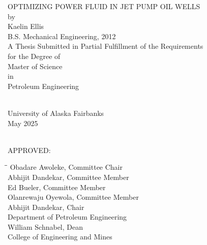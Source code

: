 \documentclass[12 pt]{report}
\begin{document}


\thispagestyle{empty}
    \begin{center}
      \uppercase{Optimizing Power Fluid in Jet Pump Oil Wells}\\
      \hfill \break by  \\
      Kaelin Ellis\\
      B.S. Mechanical Engineering, 2012\\
      \hfill \break
      A Thesis Submitted in Partial Fulfillment of the Requirements\\ 
       for the Degree of\\
      \hfill \break
      Master of Science\\
       in\\
      Petroleum Engineering\\    
      \  
         
      University of Alaska Fairbanks\\
      May 2025\\
      \
 
      APPROVED:
    \end{center}
\begin{tabbing}
\hspace{8cm}\=\hspace{1cm}\=\kill
  \> Obadare Awoleke, Committee Chair \\
  \> Abhijit Dandekar, Committee Member \\
  \> Ed Bueler, Committee Member \\
  \> Olanrewaju Oyewola, Committee Member \\
  \> Abhijit Dandekar, Chair \\
  \> \> Department of Petroleum Engineering\\
  \> William Schnabel, Dean\\
  \> \> College of Engineering and Mines\\
\end{tabbing}
  \clearpage
\end{document}
